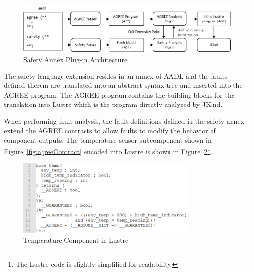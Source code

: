 \begin{figure}[h]
	\begin{center}
		\includegraphics[width=\textwidth]{images/arch.png}
	\end{center}
	\caption{Safety Annex Plug-in Architecture}
	\label{fig:plugin-arch}
\end{figure}

The safety language extension resides in an annex of AADL and the faults defined therein are translated into an abstract syntax tree and inserted into the AGREE program. The AGREE program contains the building blocks for the translation into Lustre which is the program directly analyzed by JKind.  

When performing fault analysis, the fault definitions defined in the safety annex extend the AGREE contracts to allow faults to modify the behavior of component outputs. The temperature sensor subcomponent shown in Figure~\ref{fig:agreeContract} encoded into Lustre is shown in Figure~\ref{fig:lustreTempNode}\footnote{The Lustre code is slightly simplified for readability.}.

\begin{figure}[h]
	\begin{center}
		\includegraphics[width=0.8\textwidth]{images/lustreTempNode.png}
	\end{center}
	\caption{Temperature Component in Lustre}
	\label{fig:lustreTempNode}
\end{figure}


